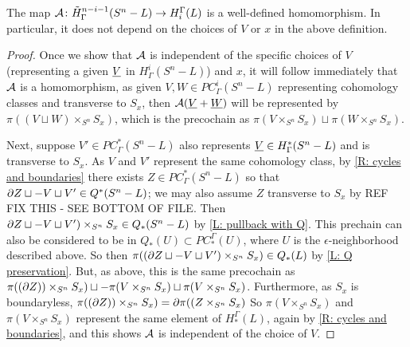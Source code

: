 \begin{example}
\begin{proposition}
The map $\mathcal{A} \colon \tilde H^{n-i-1}_\Gamma(S^n-L) \to H_i^\Gamma(L)$ is a well-defined homomorphism.
In particular, it does not depend on the choices of $V$ or $x$ in the above definition.
\end{proposition}
\begin{proof}
Once we show that $\mathcal{A}$ is independent of the specific choices of $V$ (representing a given $\underline{V}$ in $H^i_\Gamma(S^n-L)$) and $x$, it will follow immediately that $\mathcal{A}$ is a homomorphism, as given $V,W\in PC^i_\Gamma(S^n-L)$ representing cohomology classes and transverse to $S_x$, then $\mathcal{A}(\underline{V} + \underline{W})$ will be represented by $\pi((V \sqcup W) \times_{S^n} S_x)$, which is the precochain as $\pi(V  \times_{S^n} S_x) \sqcup \pi(W \times_{S^n} S_x)$.

Next, suppose $V' \in PC^*_\Gamma(S^n-L)$ also represents $\underline{V} \in H^*_\Gamma(S^n-L)$ and is transverse to $S_x$.
As $V$ and $V'$ represent the same cohomology class, by \cref{R: cycles and boundaries} there exists $Z \in PC^*_\Gamma(S^n-L)$ so that $\partial Z\sqcup -V \sqcup V' \in Q^*(S^n-L)$; we may also assume $Z$ transverse to $S_x$ by REF FIX THIS - SEE BOTTOM OF FILE.
Then $\partial Z \sqcup -V \sqcup V') \times_{S^n} S_x \in Q_*(S^n-L)$ by \cref{L: pullback with Q}.
This prechain can also be considered to be in $Q_*(U) \subset PC_*^\Gamma(U)$, where $U$ is the $\epsilon$-neighborhood described above.
So then $\pi((\partial Z \sqcup -V \sqcup V') \times_{S^n} S_x ) \in Q_*(L)$ by \cref{L: Q preservation}.
But, as above, this is the same precochain as  $\pi((\partial Z)) \times_{S^n} S_x ) \sqcup -\pi(V  \times_{S^n} S_x) \sqcup \pi(V \times_{S^n} S_x)$.
Furthermore, as $S_x$ is boundaryless, $\pi((\partial Z)) \times_{S^n} S_x) = \partial \pi((Z \times_{S^n} S_x)$
So $\pi(V  \times_{S^n} S_x)$ and $\pi(V  \times_{S^n} S_x)$ represent the same element of $H_*^\Gamma(L)$, again by \cref{R: cycles and boundaries}, and this shows $\mathcal{A}$ is independent of the choice of $V$.


\end{proof}
\end{example}

